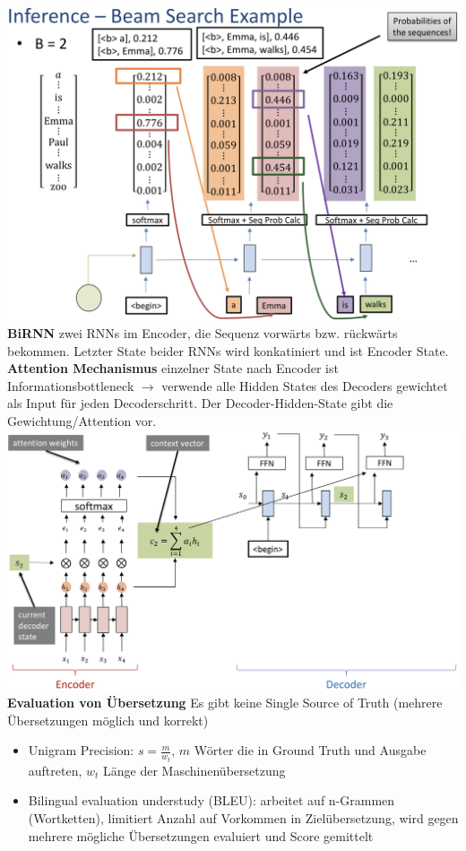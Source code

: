 \documentclass[12pt]{article}
\begin{document}
	\includegraphics[width=\linewidth]{figures/beam-search.png}\\
	\textbf{BiRNN} zwei RNNs im Encoder, die Sequenz vorwärts bzw. rückwärts bekommen. Letzter State beider RNNs wird konkatiniert und ist Encoder State.\\
	\textbf{Attention Mechanismus} einzelner State nach Encoder ist Informationsbottleneck $\rightarrow$ verwende alle Hidden States des Decoders gewichtet als Input für jeden Decoderschritt. Der Decoder-Hidden-State gibt die Gewichtung/Attention vor.\\
	\includegraphics[width=\linewidth]{figures/attention.png}\\
	\textbf{Evaluation von Übersetzung} Es gibt keine Single Source of Truth (mehrere Übersetzungen möglich und korrekt)
	\begin{itemize}
		\item Unigram Precision: $s = \frac{m}{w_t}$, $m$ Wörter die in Ground Truth und Ausgabe auftreten, $w_t$ Länge der Maschinenübersetzung
		\item Bilingual evaluation understudy (BLEU): arbeitet auf n-Grammen (Wortketten), limitiert Anzahl auf Vorkommen in Zielübersetzung, wird gegen mehrere mögliche Übersetzungen evaluiert und Score gemittelt
	\end{itemize}
\end{document}
